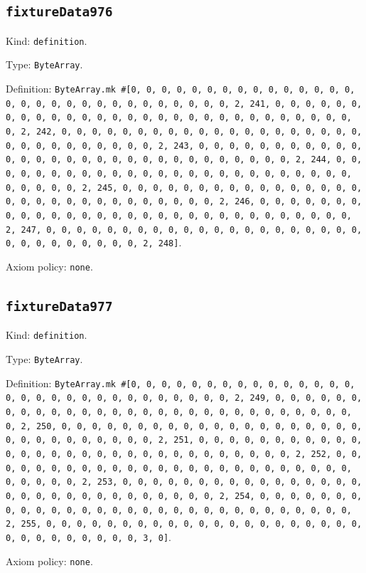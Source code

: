 \documentclass[11pt]{article}
\begin{document}
\subsection*{\texttt{fixtureData976}}
\noindent Kind: \texttt{definition}.\par
\noindent Type: \texttt{ByteArray}.\par
\noindent Definition: \texttt{ByteArray.mk \#[0, 0, 0, 0, 0, 0, 0, 0, 0, 0, 0, 0, 0, 0, 0, 0, 0, 0, 0, 0, 0, 0, 0, 0, 0, 0, 0, 0, 0, 0, 2, 241, 0, 0, 0, 0, 0, 0, 0, 0, 0, 0, 0, 0, 0, 0, 0, 0, 0, 0, 0, 0, 0, 0, 0, 0, 0, 0, 0, 0, 0, 0, 2, 242, 0, 0, 0, 0, 0, 0, 0, 0, 0, 0, 0, 0, 0, 0, 0, 0, 0, 0, 0, 0, 0, 0, 0, 0, 0, 0, 0, 0, 0, 0, 2, 243, 0, 0, 0, 0, 0, 0, 0, 0, 0, 0, 0, 0, 0, 0, 0, 0, 0, 0, 0, 0, 0, 0, 0, 0, 0, 0, 0, 0, 0, 0, 2, 244, 0, 0, 0, 0, 0, 0, 0, 0, 0, 0, 0, 0, 0, 0, 0, 0, 0, 0, 0, 0, 0, 0, 0, 0, 0, 0, 0, 0, 0, 0, 2, 245, 0, 0, 0, 0, 0, 0, 0, 0, 0, 0, 0, 0, 0, 0, 0, 0, 0, 0, 0, 0, 0, 0, 0, 0, 0, 0, 0, 0, 0, 0, 2, 246, 0, 0, 0, 0, 0, 0, 0, 0, 0, 0, 0, 0, 0, 0, 0, 0, 0, 0, 0, 0, 0, 0, 0, 0, 0, 0, 0, 0, 0, 0, 2, 247, 0, 0, 0, 0, 0, 0, 0, 0, 0, 0, 0, 0, 0, 0, 0, 0, 0, 0, 0, 0, 0, 0, 0, 0, 0, 0, 0, 0, 0, 0, 2, 248]}.\par
\noindent Axiom policy: \texttt{none}.\par
\subsection*{\texttt{fixtureData977}}
\noindent Kind: \texttt{definition}.\par
\noindent Type: \texttt{ByteArray}.\par
\noindent Definition: \texttt{ByteArray.mk \#[0, 0, 0, 0, 0, 0, 0, 0, 0, 0, 0, 0, 0, 0, 0, 0, 0, 0, 0, 0, 0, 0, 0, 0, 0, 0, 0, 0, 0, 0, 2, 249, 0, 0, 0, 0, 0, 0, 0, 0, 0, 0, 0, 0, 0, 0, 0, 0, 0, 0, 0, 0, 0, 0, 0, 0, 0, 0, 0, 0, 0, 0, 2, 250, 0, 0, 0, 0, 0, 0, 0, 0, 0, 0, 0, 0, 0, 0, 0, 0, 0, 0, 0, 0, 0, 0, 0, 0, 0, 0, 0, 0, 0, 0, 2, 251, 0, 0, 0, 0, 0, 0, 0, 0, 0, 0, 0, 0, 0, 0, 0, 0, 0, 0, 0, 0, 0, 0, 0, 0, 0, 0, 0, 0, 0, 0, 2, 252, 0, 0, 0, 0, 0, 0, 0, 0, 0, 0, 0, 0, 0, 0, 0, 0, 0, 0, 0, 0, 0, 0, 0, 0, 0, 0, 0, 0, 0, 0, 2, 253, 0, 0, 0, 0, 0, 0, 0, 0, 0, 0, 0, 0, 0, 0, 0, 0, 0, 0, 0, 0, 0, 0, 0, 0, 0, 0, 0, 0, 0, 0, 2, 254, 0, 0, 0, 0, 0, 0, 0, 0, 0, 0, 0, 0, 0, 0, 0, 0, 0, 0, 0, 0, 0, 0, 0, 0, 0, 0, 0, 0, 0, 0, 2, 255, 0, 0, 0, 0, 0, 0, 0, 0, 0, 0, 0, 0, 0, 0, 0, 0, 0, 0, 0, 0, 0, 0, 0, 0, 0, 0, 0, 0, 0, 0, 3, 0]}.\par
\noindent Axiom policy: \texttt{none}.\par
\end{document}
